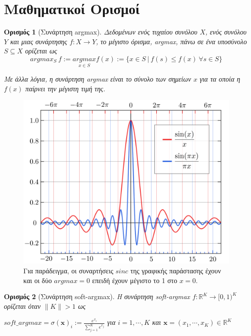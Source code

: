 \section*{Μαθηματικοί Ορισμοί}
\newtheorem{definition}{Ορισμός}
\label{appendix:math_definitions}

\begin{definition}[Συνάρτηση argmax]
\label{definition:argmax}
Δεδομένων ενός τυχαίου συνόλου \(X\), ενός συνόλου \(Y\) και μιας συνάρτησης \(f: X\rightarrow Y\), το μέγιστο όρισμα, argmax, πάνω σε ένα υποσύνολο \(S \subseteq X\) ορίζεται ως
\[argmax_{S} \: f := \underset{x \in S}{argmax} f(x) := \{x \in S \: | \: f(s) \leq f(x)  \: \forall s \in S\} \]

Με άλλα λόγια, η συνάρτηση argmax είναι το σύνολο των σημείων \(x\) για τα οποία η \(f(x)\) παίρνει την μέγιστη τιμή της.
\end{definition}

\begin{figure}[h]
\centering
\includegraphics[scale=0.2]{images/appendix/function_argmax_example.png}
\caption[Παράδειγμα συνάρτησης argmax]{Για παράδειγμα, οι συναρτήσεις \(sinc\) της γραφικής παράστασης έχουν και οι δύο \(argmax = 0\) επειδή έχουν μέγιστο το 1 στο \(x = 0\). }
\end{figure}

\begin{definition}[Συνάρτηση soft-argmax]
\label{definition:soft-argmax}
Η συνάρτηση soft-argmax \(f: \mathbb{R}^K  \rightarrow [0, 1)^K\) ορίζεται όταν \(\lVert K \rVert > 1\) ως

\(soft\_argmax = \sigma(\boldsymbol{x})_i := \frac{e^{x_i}}{\sum_{j=1}^{K}e^{x_j}}\) για \(i = 1,\cdots,K\) και \(\boldsymbol{x} = (x_1,\cdots,x_K) \in \mathbb{R}^K \)

\end{definition}


